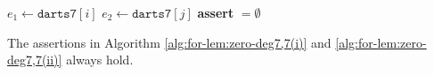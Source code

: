 \documentclass[main.tex]{subfiles}
\begin{document}
\begin{algorithm}[H]
    \caption{\checkSSSWithLink($(Z_C, \delta_C^-, \delta_C^+), \texttt{darts7}, \mathcal{C}, \bar{\mathcal{D}} \cup \{T_{7^3}\}$) - Lemma \ref{lem:zero-deg7,7}(ii)}
    \label{alg:for-lem:zero-deg7,7(ii)}
    \begin{algorithmic}[1]
            \State $e_1 \gets \texttt{darts7}[i]$
                \State $e_2 \gets \texttt{darts7}[j]$
                \State \textbf{assert}  $= \emptyset$
            \EndFor
        \EndFor
    \end{algorithmic}
\end{algorithm}

\begin{lem}
\label{lem:comp-check-deg7}
    The assertions in Algorithm \ref{alg:for-lem:zero-deg7,7(i)} and \ref{alg:for-lem:zero-deg7,7(ii)} always hold.
\end{lem}
\end{document}
